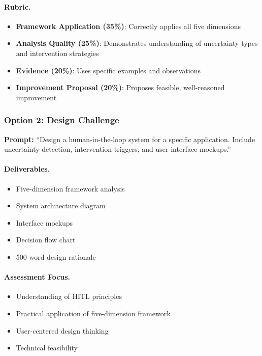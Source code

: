 \paragraph{Rubric.}
\begin{itemize}
    \item \textbf{Framework Application (35\%)}: Correctly applies all five dimensions
    \item \textbf{Analysis Quality (25\%)}: Demonstrates understanding of uncertainty types and intervention strategies
    \item \textbf{Evidence (20\%)}: Uses specific examples and observations
    \item \textbf{Improvement Proposal (20\%)}: Proposes feasible, well-reasoned improvement
\end{itemize}

\subsubsection{Option 2: Design Challenge}

\textbf{Prompt:} ``Design a human-in-the-loop system for a specific application. Include uncertainty detection, intervention triggers, and user interface mockups.''

\paragraph{Deliverables.}
\begin{itemize}
    \item Five-dimension framework analysis
    \item System architecture diagram
    \item Interface mockups
    \item Decision flow chart
    \item 500-word design rationale
\end{itemize}

\paragraph{Assessment Focus.}
\begin{itemize}
    \item Understanding of HITL principles
    \item Practical application of five-dimension framework
    \item User-centered design thinking
    \item Technical feasibility
\end{itemize}

